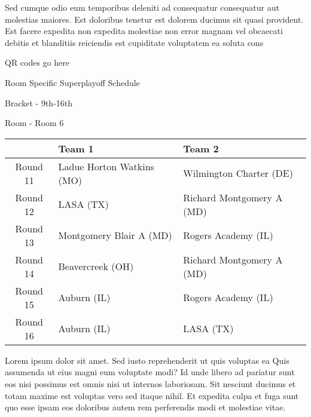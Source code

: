 \documentclass{article}%
\begin{document}
\newline%
    Sed cumque odio eum temporibus deleniti ad consequatur consequatur aut molestias maiores. Est doloribus tenetur est dolorem ducimus sit quasi provident. Est facere expedita non expedita molestiae non error magnam vel obcaecati debitis et blanditiis reiciendis est cupiditate voluptatem ea soluta cons%
\vspace*{140pt}%
\begin{center}%
\begin{Huge}%
QR codes go here%
\end{Huge}%
\end{center}%
\newpage%
\begin{center}%
\begin{Huge}%
Room Specific Superplayoff Schedule%
\end{Huge}%
\vspace*{8pt}%
\linebreak%
\begin{Large}%
Bracket {-} 9th{-}16th%
\end{Large}%
\vspace*{8pt}%
\linebreak%
\vspace*{8pt}%
\begin{Large}%
Room {-} Room 6%
\end{Large}%
\end{center}%
%
\begin{tabularx}{\textwidth}{|c|Y|Y|}%
\hline%
&Team 1&Team 2\\%
\hline%
Round 11&Ladue Horton Watkins (MO)&Wilmington Charter (DE)\\%
Round 12&LASA (TX)&Richard Montgomery A (MD)\\%
Round 13&Montgomery Blair A (MD)&Rogers Academy (IL)\\%
Round 14&Beavercreek (OH)&Richard Montgomery A (MD)\\%
Round 15&Auburn (IL)&Rogers Academy (IL)\\%
Round 16&Auburn (IL)&LASA (TX)\\%
\hline%
\end{tabularx}%
\vspace*{8pt}%
\newline%
    Lorem ipsum dolor sit amet. Sed iusto reprehenderit ut quis voluptas ea Quis assumenda ut eius magni eum voluptate modi? Id unde libero ad pariatur sunt eos nisi possimus est omnis nisi ut internos laboriosam. Sit nesciunt ducimus et totam maxime est voluptas vero sed itaque nihil. Et expedita culpa et fuga sunt quo esse ipsam eos doloribus autem rem perferendis modi et molestiae vitae.\newline%
\end{document}
